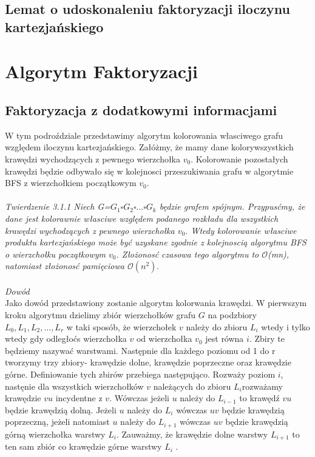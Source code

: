 \documentclass[12pt,a4paper,titlepage]{article}
\begin{document}
\subsection{Lemat o udoskonaleniu faktoryzacji iloczynu kartezjańskiego}

\section{Algorytm Faktoryzacji}
\subsection{Faktoryzacja z dodatkowymi informacjami}
W tym podroździale przedstawimy algorytm kolorowania własciwego grafu względem iloczynu kartezjańskiego. Załóżmy, że mamy dane kolorywszystkich krawędzi wychodzących z pewnego wierzchołka $v_0$. Kolorowanie pozostałych krawędzi będzie odbywało się w kolejnosci przeszukiwania grafu w algorytmie BFS z wierzchołkiem początkowym $v_0$. \\
\\
\textit{Twierdzenie 3.1.1 Niech G=$G_1 \square G_2 \square ... \square G_k$ będzie grafem spójnym. Przypusćmy, że dane jest kolorawnie własciwe względem podanego rozkładu dla wszystkich krawędzi wychodzących z pewnego wierzchołka $v_0$. Wtedy  kolorowanie własciwe produktu kartezjańskiego może być uzyskane zgodnie z kolejnoscią algorytmu BFS o wierzchołku początkowym $v_0$. Złożonosć czasowa tego algorytmu to $\mathcal{O}$(mn), natomiast złożonosć pamięciowa $\mathcal{O}(n^2)$}.\\
\\
\textit{Dowód}\\
Jako dowód przedstawiony zostanie algorytm kolorwania krawędzi. W pierwszym kroku algorytmu dzielimy zbiór wierzchołków grafu $G$ na podzbiory $L_0 , L_1, L_2 , ..., L_r$ w taki sposób, że wierzchołek $v$ należy do zbioru $L_i$ wtedy i tylko wtedy gdy odległoćs wierzchołka $v$ od wierzchołka $v_0$ jest równa $i$. Zbiry te będziemy nazywać warstwami. Następnie dla każdego poziomu od 1 do r tworzymy trzy zbiory- krawędzie dolne, krawędzie poprzeczne oraz krawędzie górne. Definiowanie tych zbirów przebiega następująco. Rozważy poziom $i$, nastęnie dla wszystkich wierzchołków $v$ należących do zbioru $L_i$rozważamy krawędzie $vu$ incydentne z $v$. Wówczas jeżeli $u$ należy do $L_{i-1}$ to krawędź $vu$ będzie krawędzią dolną. Jeżeli $u$ należy do $L_i$ wówczas $uv$ będzie krawędzią poprzeczną, jeżeli natomiast $u$ należy do $L_{i+1}$ wówczas $uv$ będzie krawędzią górną wierzchołka warstwy $L_i$. Zauważmy, że krawędzie dolne warstwy $L_{i+1}$ to ten sam zbiór co krawędzie górne warstwy $L_{i}$ .\\
\end{document}
